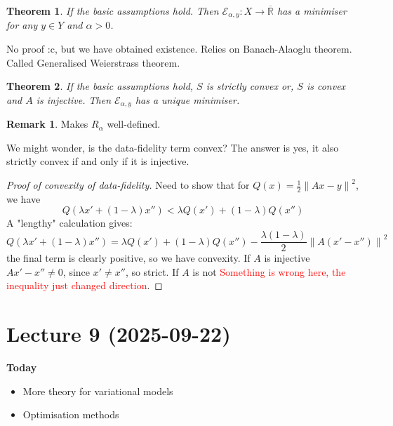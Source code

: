 \documentclass[12pt]{article}
\newtheorem{theorem}{Theorem}[section]
\theoremstyle{definition}
\newtheorem*{remark}{Remark}
\newcommand{\real}{\mathbb{R}}   %
\newcommand\norm[1]{\left\lVert#1\right\rVert}
\begin{document}
\begin{theorem}
    If the basic assumptions hold. Then $\mathcal{E}_{\alpha,y}:X\to \overline{\real}$ has a minimiser for any $y\in Y$ and $\alpha>0$. 
\end{theorem}
No proof :c, but we have obtained existence. Relies on Banach-Alaoglu theorem. Called Generalised Weierstrass theorem.

\begin{theorem}
    If the basic assumptions hold, $S$ is strictly convex or, $S$ is convex and $A$ is injective. Then $\mathcal{E}_{\alpha,y}$ has a unique minimiser.
\end{theorem}
\begin{remark}
    Makes $R_\alpha$ well-defined.
\end{remark}
We might wonder, is the data-fidelity term convex? The answer is yes, it also strictly convex if and only if it is injective.
\begin{proof}[Proof of convexity of data-fidelity]
    Need to show that for $Q(x)=\frac{1}{2}\norm{Ax-y}^2$, we have
    \begin{equation*}
        Q(\lambda x' + (1-\lambda)x'') < \lambda Q(x') + (1-\lambda)Q(x'')
    \end{equation*} 
    A "lengthy" calculation gives:
    \begin{equation*}
        Q(\lambda x' + (1-\lambda)x'') = \lambda Q(x') + (1-\lambda)Q(x'') - \frac{\lambda(1-\lambda)}{2}\norm{A(x'-x'')}^2
    \end{equation*}
    the final term is clearly positive, so we have convexity. If $A$ is injective $Ax'-x''\neq 0$, since $x'\neq x''$, so strict. If $A$ is not \textcolor{red}{Something is wrong here, the inequality just changed direction}.
\end{proof}


\newpage

\section{Lecture 9 (2025-09-22)}
\textbf{Today}
\begin{itemize}
    \item More theory for variational models
    \item Optimisation methods
\end{itemize}
\end{document}
